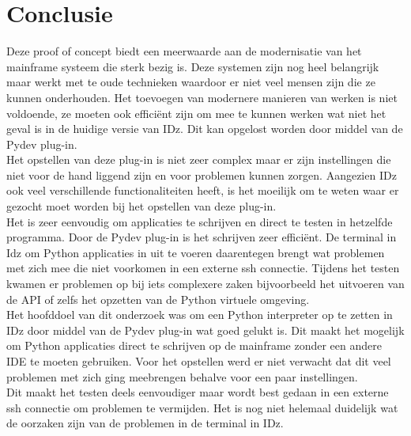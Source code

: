 
\chapter{Conclusie}%
\label{ch:conclusie}


Deze proof of concept biedt een meerwaarde aan de modernisatie van het mainframe systeem die sterk bezig is. Deze systemen zijn nog heel belangrijk maar werkt met te oude technieken waardoor er niet veel mensen zijn die ze kunnen onderhouden. Het toevoegen van modernere manieren van werken is niet voldoende, ze moeten ook efficiënt zijn om mee te kunnen werken wat niet het geval is in de huidige versie van IDz. Dit kan opgelost worden door middel van de Pydev plug-in. \\

Het opstellen van deze plug-in is niet zeer complex maar er zijn instellingen die niet voor de hand liggend zijn en voor problemen kunnen zorgen. Aangezien IDz ook veel verschillende functionaliteiten heeft, is het moeilijk om te weten waar er gezocht moet worden bij het opstellen van deze plug-in. \\

Het is zeer eenvoudig om applicaties te schrijven en direct te testen in hetzelfde programma. Door de Pydev plug-in is het schrijven zeer efficiënt. De terminal in Idz om Python applicaties in uit te voeren daarentegen brengt wat problemen met zich mee die niet voorkomen in een externe ssh connectie.
Tijdens het testen kwamen er problemen op bij iets complexere zaken bijvoorbeeld het uitvoeren van de API of zelfs het opzetten van de Python virtuele omgeving. \\

Het hoofddoel van dit onderzoek was om een Python interpreter op te zetten in IDz door middel van de Pydev plug-in wat goed gelukt is. Dit maakt het mogelijk om Python applicaties direct te schrijven op de mainframe zonder een andere IDE te moeten gebruiken. Voor het opstellen werd er niet verwacht dat dit veel problemen met zich ging meebrengen behalve voor een paar instellingen. \\
Dit maakt het testen deels eenvoudiger maar wordt best gedaan in een externe ssh connectie om problemen te vermijden. Het is nog niet helemaal duidelijk wat de oorzaken zijn van de problemen in de terminal in IDz. \\

